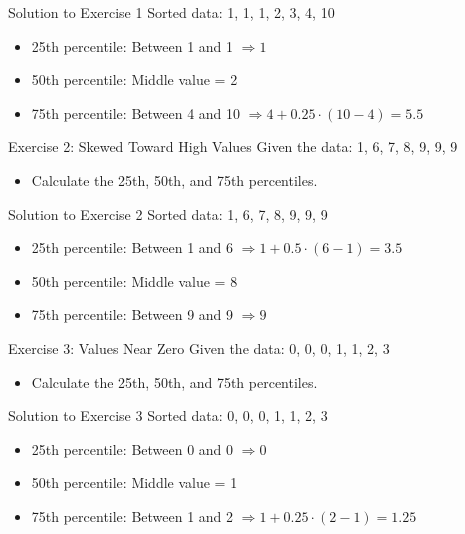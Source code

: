 \documentclass{beamer}
\begin{document}
\begin{frame}{Solution to Exercise 1}
Sorted data: 1, 1, 1, 2, 3, 4, 10
\begin{itemize}
  \item 25th percentile: Between 1 and 1 \( \Rightarrow 1 \)
  \item 50th percentile: Middle value = 2
  \item 75th percentile: Between 4 and 10 \( \Rightarrow 4 + 0.25\cdot(10-4) = 5.5 \)
\end{itemize}
\end{frame}

\begin{frame}{Exercise 2: Skewed Toward High Values}
Given the data: 1, 6, 7, 8, 9, 9, 9

\begin{itemize}
  \item Calculate the 25th, 50th, and 75th percentiles.
\end{itemize}
\end{frame}

\begin{frame}{Solution to Exercise 2}
Sorted data: 1, 6, 7, 8, 9, 9, 9
\begin{itemize}
  \item 25th percentile: Between 1 and 6 \( \Rightarrow 1 + 0.5\cdot(6-1) = 3.5 \)
  \item 50th percentile: Middle value = 8
  \item 75th percentile: Between 9 and 9 \( \Rightarrow 9 \)
\end{itemize}
\end{frame}

\begin{frame}{Exercise 3: Values Near Zero}
Given the data: 0, 0, 0, 1, 1, 2, 3

\begin{itemize}
  \item Calculate the 25th, 50th, and 75th percentiles.
\end{itemize}
\end{frame}

\begin{frame}{Solution to Exercise 3}
Sorted data: 0, 0, 0, 1, 1, 2, 3
\begin{itemize}
  \item 25th percentile: Between 0 and 0 \( \Rightarrow 0 \)
  \item 50th percentile: Middle value = 1
  \item 75th percentile: Between 1 and 2 \( \Rightarrow 1 + 0.25\cdot(2-1) = 1.25 \)
\end{itemize}
\end{frame}
\end{document}
